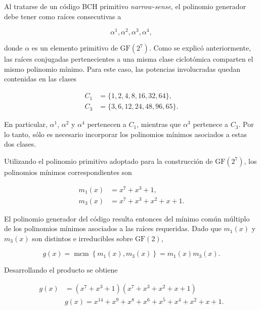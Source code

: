 \documentclass[10pt,a4paper]{article}
\begin{document}
Al tratarse de un código BCH primitivo \textit{narrow-sense}, el polinomio
generador debe tener como raíces consecutivas a

\begin{equation}
    \alpha^1,\alpha^2,\alpha^3,\alpha^4,
\end{equation}

donde $\alpha$ es un elemento primitivo de $\mathrm{GF}(2^7)$. Como se explicó
anteriormente, las raíces conjugadas pertenecientes a una misma clase ciclotómica
comparten el mismo polinomio mínimo. Para este caso, las potencias involucradas
quedan contenidas en las clases

\begin{align}
    C_1 &= \{1,2,4,8,16,32,64\}, \\
    C_3 &= \{3,6,12,24,48,96,65\}.
\end{align}

En particular, $\alpha^1$, $\alpha^2$ y $\alpha^4$ pertenecen a $C_1$, mientras
que $\alpha^3$ pertenece a $C_3$. Por lo tanto, sólo es necesario incorporar los
polinomios mínimos asociados a estas dos clases.

Utilizando el polinomio primitivo adoptado para la construcción de
$\mathrm{GF}(2^7)$, los polinomios mínimos correspondientes son

\begin{align}
    m_1(x) &= x^7+x^3+1, \\
    m_3(x) &= x^7+x^3+x^2+x+1.
\end{align}

El polinomio generador del código resulta entonces del mínimo común múltiplo
de los polinomios mínimos asociados a las raíces requeridas. Dado que
$m_1(x)$ y $m_3(x)$ son distintos e irreducibles sobre $\mathrm{GF}(2)$,

\begin{equation}
    g(x)
    =
    \operatorname{mcm}
    \left\{
        m_1(x),m_3(x)
    \right\}
    =
    m_1(x)m_3(x).
\end{equation}

Desarrollando el producto se obtiene

\begin{equation}
\begin{split}
    g(x)
    &=
    \left(x^7+x^3+1\right)
    \left(x^7+x^3+x^2+x+1\right) \\
    &g(x) = x^{14}+x^9+x^8+x^6+x^5+x^4+x^2+x+1.
\end{split}
\label{eq:polinomio-generador}
\end{equation}
\end{document}
